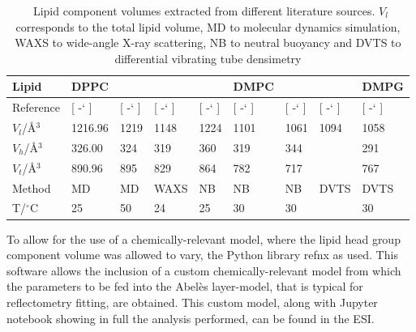 \documentclass[twoside,twocolumn,9pt]{article}
\newcommand*{\citen}[1]{%
	\begingroup
	\romannumeral-`\x %
	\setcitestyle{numbers}%
	\cite{#1}%
	\endgroup   
}
\begin{document}
\begin{table}
	\small
	\caption{\ Lipid component volumes extracted from different literature sources. $V_l$ corresponds to the total lipid volume, MD to molecular dynamics simulation, WAXS to wide-angle X-ray scattering, NB to neutral buoyancy and DVTS to differential vibrating tube densimetry}
	\label{tab:water}
	\begin{tabular*}{\textwidth}{@{\extracolsep{\fill}}lllllllll}
		\hline 
		Lipid & DPPC & & & & DMPC & & & DMPG \\
		\hline
		Reference & [\citen{Armen1998}] & [\citen{Petrache1997}] & [\citen{Sun1994}] & [\citen{Tardieu1973}] & [\citen{Kucerka2004}] & [\citen{Nagle1978}] & [\citen{Schmidt1985}] & [\citen{Pan2012}] \\
		$V_l$/\AA$^3$ &1216.96 & 1219 & 1148 & 1224 & 1101 & 1061 & 1094 & 1058 \\
		$V_h$/\AA$^3$ & 326.00 & 324 & 319 & 360 & 319 & 344 & & 291 \\
		$V_t$/\AA$^3$ & 890.96 & 895 & 829 & 864 & 782 & 717 & & 767 \\
		Method & MD & MD & WAXS & NB & NB & NB & DVTS & DVTS \\
		T/$^\circ$C & 25 & 50 & 24 & 25 & 30 & 30 & & 30 \\
		\hline
	\end{tabular*}
\end{table}

To allow for the use of a chemically-relevant model, where the lipid head group component volume was allowed to vary, the Python library refnx\cite{Nelson2018} as used. This software allows the inclusion of a custom chemically-relevant model from which the parameters to be fed into the Abel\`{e}s layer-model,\cite{Abeles1950,Parratt1954} that is typical for reflectometry fitting, are obtained. This custom model, along with Jupyter notebook showing in full the analysis performed, can be found in the ESI. 
\end{document}
